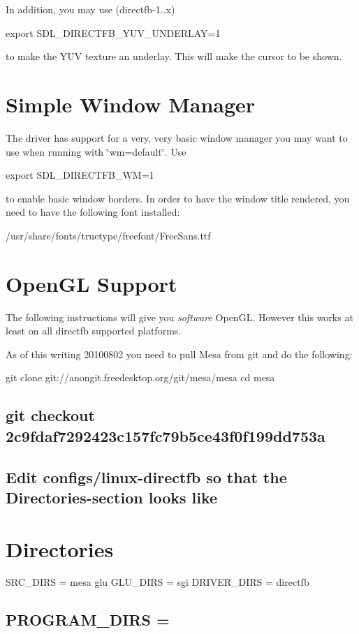 In addition, you may use (directfb-\/1..\+x)

export S\+D\+L\+\_\+\+D\+I\+R\+E\+C\+T\+F\+B\+\_\+\+Y\+U\+V\+\_\+\+U\+N\+D\+E\+R\+L\+AY=1

to make the Y\+UV texture an underlay. This will make the cursor to be shown.

\section*{Simple Window Manager }

The driver has support for a very, very basic window manager you may want to use when running with \char`\"{}wm=default\char`\"{}. Use

export S\+D\+L\+\_\+\+D\+I\+R\+E\+C\+T\+F\+B\+\_\+\+WM=1

to enable basic window borders. In order to have the window title rendered, you need to have the following font installed\+:

/usr/share/fonts/truetype/freefont/\+Free\+Sans.ttf

\section*{Open\+GL Support }

The following instructions will give you {\itshape software} Open\+GL. However this works at least on all directfb supported platforms.

As of this writing 20100802 you need to pull Mesa from git and do the following\+: 

 git clone git\+://anongit.freedesktop.\+org/git/mesa/mesa cd mesa \subsection*{git checkout 2c9fdaf7292423c157fc79b5ce43f0f199dd753a }

\subsection*{Edit configs/linux-\/directfb so that the Directories-\/section looks like }

\section*{Directories}

S\+R\+C\+\_\+\+D\+I\+RS = mesa glu G\+L\+U\+\_\+\+D\+I\+RS = sgi D\+R\+I\+V\+E\+R\+\_\+\+D\+I\+RS = directfb \subsection*{P\+R\+O\+G\+R\+A\+M\+\_\+\+D\+I\+RS = }

